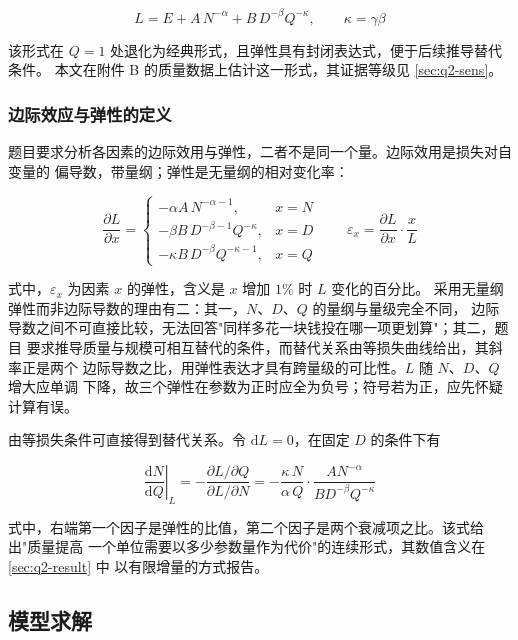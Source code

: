 \documentclass[bwprint]{gmcmthesis}
\numberwithin{equation}{section}
\numberwithin{figure}{section}
\numberwithin{table}{section}
\begin{document}
\begin{equation}
L=E+A\,N^{-\alpha}+B\,D^{-\beta}Q^{-\kappa},\qquad \kappa=\gamma\beta
\end{equation}

该形式在 $Q=1$ 处退化为经典形式，且弹性具有封闭表达式，便于后续推导替代条件。
本文在附件 B 的质量数据上估计这一形式，其证据等级见 \ref{sec:q2-sens}。

\subsubsection{边际效应与弹性的定义}

题目要求分析各因素的边际效用与弹性，二者不是同一个量。边际效用是损失对自变量的
偏导数，带量纲；弹性是无量纲的相对变化率：

\begin{equation}
\frac{\partial L}{\partial x}
=\begin{cases}
-\alpha A\,N^{-\alpha-1}, & x=N\\[2pt]
-\beta B\,D^{-\beta-1}Q^{-\kappa}, & x=D\\[2pt]
-\kappa B\,D^{-\beta}Q^{-\kappa-1}, & x=Q
\end{cases}
\qquad
\varepsilon_x=\frac{\partial L}{\partial x}\cdot\frac{x}{L}
\end{equation}

式中，$\varepsilon_x$ 为因素 $x$ 的弹性，含义是 $x$ 增加 $1\%$ 时 $L$ 变化的百分比。
采用无量纲弹性而非边际导数的理由有二：其一，$N$、$D$、$Q$ 的量纲与量级完全不同，
边际导数之间不可直接比较，无法回答"同样多花一块钱投在哪一项更划算"；其二，题目
要求推导质量与规模可相互替代的条件，而替代关系由等损失曲线给出，其斜率正是两个
边际导数之比，用弹性表达才具有跨量级的可比性。$L$ 随 $N$、$D$、$Q$ 增大应单调
下降，故三个弹性在参数为正时应全为负号；符号若为正，应先怀疑计算有误。

由等损失条件可直接得到替代关系。令 $\mathrm{d}L=0$，在固定 $D$ 的条件下有

\begin{equation}
\left.\frac{\mathrm{d}N}{\mathrm{d}Q}\right|_{L}
=-\frac{\partial L/\partial Q}{\partial L/\partial N}
=-\frac{\kappa\,N}{\alpha\,Q}\cdot\frac{AN^{-\alpha}}{BD^{-\beta}Q^{-\kappa}}
\end{equation}

式中，右端第一个因子是弹性的比值，第二个因子是两个衰减项之比。该式给出"质量提高
一个单位需要以多少参数量作为代价"的连续形式，其数值含义在 \ref{sec:q2-result} 中
以有限增量的方式报告。

\subsection{模型求解}
\end{document}
